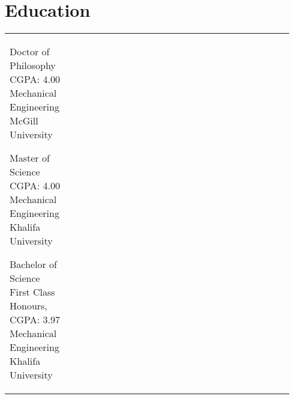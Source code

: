 \documentclass[10pt]{article} %
\begin{document}



\section{Education} 





\begin{supertabular}{>{\raggedleft\arraybackslash}p{0.17\linewidth}p{0.6\linewidth}>{\raggedleft\arraybackslash}p{0.17\linewidth}} %


	{Doctor of Philosophy} %
	{CGPA: 4.00} %
	{Mechanical Engineering} %
	{McGill University} %


	{Master of Science} %
	{CGPA: 4.00} %
	{Mechanical Engineering} %
	{Khalifa University} %


	{Bachelor of Science} %
	{First Class Honours, CGPA: 3.97} %
	{Mechanical Engineering} %
	{Khalifa University} %


\end{supertabular}
\end{document}
